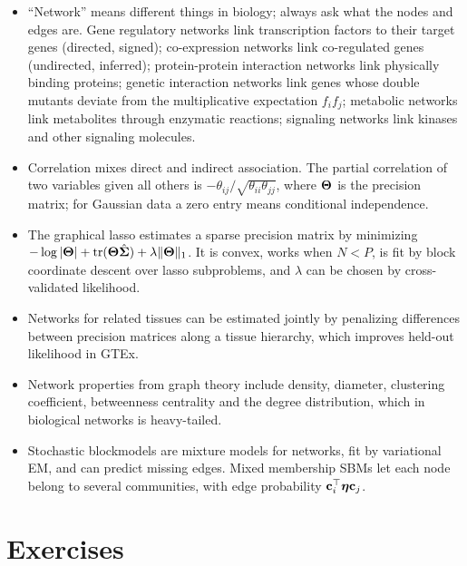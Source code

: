 \begin{itemize}
  \item ``Network'' means different things in biology; always ask what the nodes and edges are. Gene regulatory networks link transcription factors to their target genes (directed, signed); co-expression networks link co-regulated genes (undirected, inferred); protein-protein interaction networks link physically binding proteins; genetic interaction networks link genes whose double mutants deviate from the multiplicative expectation $f_if_j$; metabolic networks link metabolites through enzymatic reactions; signaling networks link kinases and other signaling molecules.
  \item Correlation mixes direct and indirect association. The partial correlation of two variables given all others is $-\theta_{ij}/\sqrt{\theta_{ii}\theta_{jj}}$, where $\boldsymbol{\Theta}$ is the precision matrix; for Gaussian data a zero entry means conditional independence.
  \item The graphical lasso estimates a sparse precision matrix by minimizing $-\log|\boldsymbol{\Theta}|+\operatorname{tr}(\boldsymbol{\Theta}\hat{\boldsymbol{\Sigma}})+\lambda\|\boldsymbol{\Theta}\|_1$. It is convex, works when $N<P$, is fit by block coordinate descent over lasso subproblems, and $\lambda$ can be chosen by cross-validated likelihood.
  \item Networks for related tissues can be estimated jointly by penalizing differences between precision matrices along a tissue hierarchy, which improves held-out likelihood in GTEx.
  \item Network properties from graph theory include density, diameter, clustering coefficient, betweenness centrality and the degree distribution, which in biological networks is heavy-tailed.
  \item Stochastic blockmodels are mixture models for networks, fit by variational EM, and can predict missing edges. Mixed membership SBMs let each node belong to several communities, with edge probability $\mathbf{c}_i^\top\boldsymbol{\eta}\mathbf{c}_j$.
\end{itemize}

\section*{Exercises}

